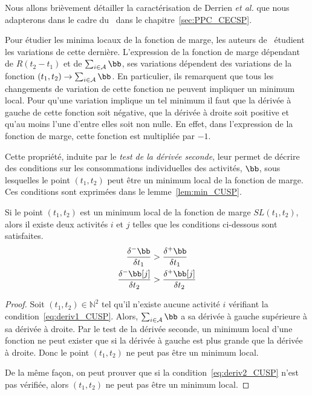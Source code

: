 Nous allons brièvement détailler la caractérisation de Derrien {\it et
al.} que nous adapterons dans le cadre du \CECSP~dans le
chapitre~\ref{sec:PPC_CECSP}.

Pour étudier les minima locaux de la fonction de marge, les auteurs
de~\cite{DP} étudient les variations de cette dernière. L'expression
de la fonction de marge dépendant de $R(t_2-t_1)$ et de $\sum_{i \in
  \A} \bb$, ses variations dépendent des variations de la fonction
$(t_1,t_2) \rightarrow \sum_{i \in \A} \bb$. En particulier, ils
remarquent que tous les changements de variation de cette fonction ne
peuvent impliquer un minimum local. Pour qu'une variation implique un
tel minimum il faut que la dérivée à gauche de cette fonction soit
négative, que la dérivée à droite soit positive et qu'au moins l'une
d'entre elles soit non nulle. En effet, dans l'expression de la
fonction de marge, cette fonction est multipliée par $-1$.

Cette propriété, induite par le {\it test de la dérivée seconde}, leur
permet de décrire des conditions sur les consommations individuelles
des activités, $\bb$, sous lesquelles le point $(t_1,t_2)$ peut être
un minimum local de la fonction de marge. Ces conditions sont
exprimées dans le lemme~\ref{lem:min_CUSP}.

\begin{lemma}
\label{lem:min_CUSP}
Si le point $(t_1,t_2)$ est un minimum local de la fonction de marge
$SL(t_1,t_2)$, alors il existe deux activités $i$ et $j$ telles que les
conditions ci-dessous sont satisfaites. 
\begin{align} \frac{\delta^{-}\bb}{\delta t_1} &>
\frac{\delta^{+}\bb}{\delta t_1} \label{eq:deriv1_CUSP}\\ 
\frac{\delta^{-}\bb[j]}{\delta t_2}
& > \frac{\delta^{+}\bb[j]}{\delta t_2} \label{eq:deriv2_CUSP}
\end{align}
\end{lemma}

\begin{proof}
Soit $(t_1,t_2) \in \mathbb{N}^2$ tel qu'il n'existe aucune activité
$i$ vérifiant la condition~\eqref{eq:deriv1_CUSP}. Alors, $\sum_{i \in
  \A} \bb$ a sa dérivée à gauche supérieure à sa dérivée à droite. Par
le test de la dérivée seconde, un minimum local d'une fonction ne peut
exister que si la dérivée à gauche est plus grande que la dérivée à
droite. Donc le point $(t_1,t_2)$ ne peut pas être un minimum local. 

De la même façon, on peut prouver que si la
condition~\eqref{eq:deriv2_CUSP} n'est pas vérifiée, alors $(t_1,t_2)$
ne peut pas être un minimum local. 
\end{proof}

